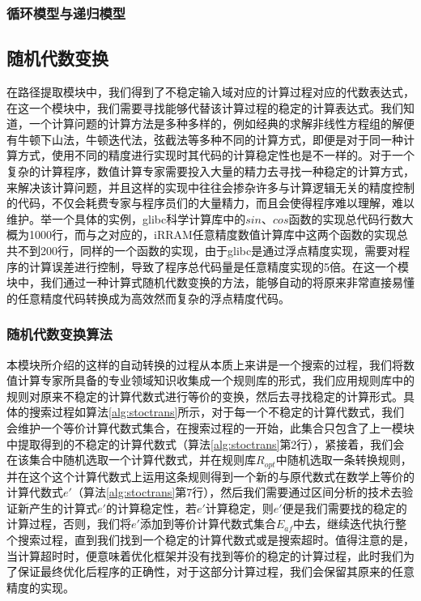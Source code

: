 \subsubsection{循环模型与递归模型}

\subsection{随机代数变换}

在路径提取模块中，我们得到了不稳定输入域对应的计算过程对应的代数表达式，在这一个模块中，我们需要寻找能够代替该计算过程的稳定的计算表达式。我们知道，一个计算问题的计算方法是多种多样的，例如经典的求解非线性方程组的解便有牛顿下山法，牛顿迭代法，弦截法等多种不同的计算方式，即便是对于同一种计算方式，使用不同的精度进行实现时其代码的计算稳定性也是不一样的。对于一个复杂的计算程序，数值计算专家需要投入大量的精力去寻找一种稳定的计算方式，来解决该计算问题，并且这样的实现中往往会掺杂许多与计算逻辑无关的精度控制的代码，不仅会耗费专家与程序员们的大量精力，而且会使得程序难以理解，难以维护。举一个具体的实例，glibc科学计算库中的$sin$、$cos$函数的实现总代码行数大概为1000行，而与之对应的，iRRAM任意精度数值计算库中这两个函数的实现总共不到200行，同样的一个函数的实现，由于glibc是通过浮点精度实现，需要对程序的计算误差进行控制，导致了程序总代码量是任意精度实现的5倍。在这一个模块中，我们通过一种计算式随机代数变换的方法，能够自动的将原来非常直接易懂的任意精度代码转换成为高效然而复杂的浮点精度代码。

\subsubsection{随机代数变换算法}

本模块所介绍的这样的自动转换的过程从本质上来讲是一个搜索的过程，我们将数值计算专家所具备的专业领域知识收集成一个规则库的形式，我们应用规则库中的规则对原来不稳定的计算代数式进行等价的变换，然后去寻找稳定的计算形式。具体的搜索过程如算法\ref{alg:stoctrans}所示，对于每一个不稳定的计算代数式，我们会维护一个等价计算代数式集合，在搜索过程的一开始，此集合只包含了上一模块中提取得到的不稳定的计算代数式（算法\ref{alg:stoctrans}第2行），紧接着，我们会在该集合中随机选取一个计算代数式，并在规则库$R_{opt}$中随机选取一条转换规则，并在这个这个计算代数式上运用这条规则得到一个新的与原代数式在数学上等价的计算代数式$e'$（算法\ref{alg:stoctrans}第7行），然后我们需要通过区间分析的技术去验证新产生的计算式$e'$的计算稳定性，若$e'$计算稳定，则$e'$便是我们需要找的稳定的计算过程，否则，我们将$e'$添加到等价计算代数式集合$E_{af}$中去，继续迭代执行整个搜索过程，直到我们找到一个稳定的计算代数式或是搜索超时。值得注意的是，当计算超时时，便意味着优化框架并没有找到等价的稳定的计算过程，此时我们为了保证最终优化后程序的正确性，对于这部分计算过程，我们会保留其原来的任意精度的实现。

